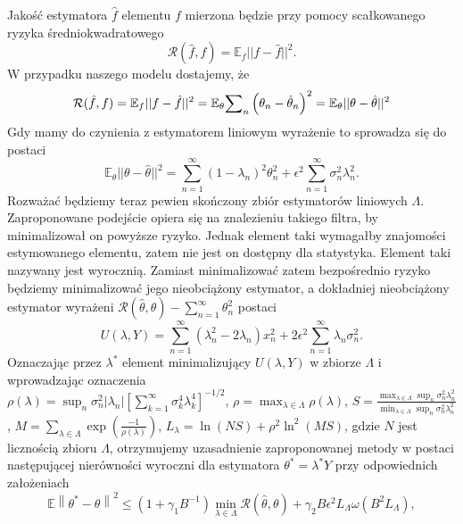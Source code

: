 \documentclass[a0,portrait]{a0poster}
\newcommand{\norm}[1]{\left\lVert#1\right\rVert}
\begin{document}
\begin{multicols}{2}
Jakość estymatora $\hat{f}$ elementu $f$ mierzona będzie przy pomocy scałkowanego ryzyka średniokwadratowego
\begin{displaymath}
\mathcal{R}(\hat{f},f)=\mathbb{E}_f||f-\hat{f}||^2.
\end{displaymath}
W przypadku naszego modelu dostajemy, że 
\begin{displaymath}
\mathcal{R}(\hat{f},f)=\mathbb{E}_f||f-\hat{f}||^2=\mathbb{E}_{\theta} \Huge{\sum}_n \left(\theta_n-\hat{\theta}_n\right)^2=\mathbb{E}_{\theta}||\theta-\hat{\theta}||^2
\end{displaymath}
Gdy mamy do czynienia z estymatorem liniowym wyrażenie to sprowadza się do postaci 
\begin{displaymath}
\mathbb{E}_{\theta}||\theta-\hat{\theta}||^2
=\sum_{n=1}^{\infty}(1-\lambda_n)^2\theta_n^2+\epsilon^2\sum_{n=1}^{\infty}\sigma_n^2\lambda_n^2.
\end{displaymath}
Rozważać będziemy teraz pewien skończony zbiór estymatorów liniowych $\Lambda$.\\
Zaproponowane podejście opiera się na znalezieniu takiego filtra, by minimalizował on powyższe ryzyko. Jednak element taki wymagałby znajomości estymowanego elementu, zatem nie jest on dostępny dla statystyka. Element taki nazywany jest wyrocznią. Zamiast minimalizować zatem bezpośrednio ryzyko będziemy minimalizować jego nieobciążony estymator, a dokładniej nieobciążony estymator wyrażeni $\mathcal{R}(\hat{\theta},\theta)-\sum_{n=1}^{\infty}\theta_n^2$ postaci
\begin{displaymath}
U(\lambda,Y)=\sum_{n=1}^{\infty}(\lambda_n^2-2\lambda_n)x_n^2+2\epsilon^2\sum_{n=1}^{\infty}\lambda_n\sigma_n^2.
\end{displaymath}
Oznaczając przez $\lambda^*$ element minimalizujący $U(\lambda,Y)$ w zbiorze $\Lambda$ i wprowadzając oznaczenia \\
$\rho(\lambda)=\sup_n\sigma_n^2|\lambda_n|\left[\sum_{k=1}^{\infty}\sigma_k^4\lambda_k^4\right]^{-1/2}$, $\rho=\max_{\lambda\in \Lambda}\rho(\lambda)$, $S=\frac{\max_{\lambda\in\Lambda}\sup_n\sigma_n^2\lambda_n^2}{\min_{\lambda\in \Lambda}\sup_n\sigma_n^2\lambda_n^2}$, $M=\sum_{\lambda\in \Lambda}\exp\left(\frac{-1}{\rho(\lambda)}\right)$, $L_{\lambda}=\ln(NS)+\rho^2\ln^2(MS)$,
gdzie $N$ jest licznością zbioru $\Lambda$, otrzymujemy uzasadnienie zaproponowanej metody w postaci następującej nierówności wyroczni dla estymatora $\theta^*=\lambda^*Y$ przy odpowiednich założeniach
\begin{displaymath}
\mathbb{E}\norm{\theta^*-\theta}^2\leq (1+\gamma_1B^{-1})\min_{\lambda\in \Lambda}\mathcal{R}(\hat{\theta},\theta)+\gamma_2B\epsilon^2L_{\Lambda}\omega(B^2L_{\Lambda}),

\end{displaymath}
\end{multicols}
\end{document}
